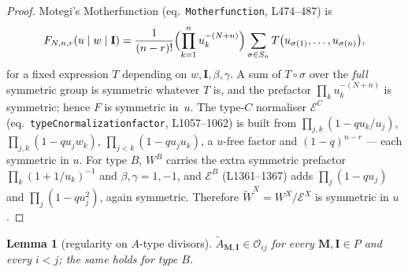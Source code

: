 \documentclass[11pt]{article}
\theoremstyle{plain}
\newtheorem{lem}[thm]{Lemma}
\theoremstyle{definition}
\theoremstyle{remark}
\theoremstyle{plain}
\newcommand{\bI}{\mathbf{I}}
\newcommand{\bM}{\mathbf{M}}
\newcommand{\At}{\widetilde{A}}
\begin{document}
\begin{proof}
Motegi's Motherfunction (eq.\ \texttt{Motherfunction}, L474--487) is
\[
   F_{N,n,r}(u\mid w\mid\bI)
   =\frac{1}{(n-r)!}\Bigl(\prod_{k=1}^{n}u_k^{-(N+n)}\Bigr)
     \sum_{\sigma\in S_n}T\bigl(u_{\sigma(1)},\dots,u_{\sigma(n)}\bigr),
\]
for a fixed expression $T$ depending on $w,\bI,\beta,\gamma$.  A sum of
$T\circ\sigma$ over the \emph{full} symmetric group is symmetric whatever $T$ is,
and the prefactor $\prod_k u_k^{-(N+n)}$ is symmetric; hence $F$ is symmetric
in~$u$.  The type-$C$ normaliser $\mathcal{E}^C$ (eq.\
\texttt{typeCnormalizationfactor}, L1057--1062) is built from
$\prod_{j,k}(1-qu_k/u_j)$, $\prod_{j,k}(1-qu_jw_k)$, $\prod_{j<k}(1-qu_ju_k)$,
a $u$-free factor and $(1-q)^{n-r}$ --- each symmetric in $u$.  For type $B$,
$W^B$ carries the extra symmetric prefactor $\prod_k(1+1/u_k)^{-1}$ and
$\beta,\gamma=1,-1$, and $\mathcal{E}^B$ (L1361--1367) adds
$\prod_j(1-qu_j)$ and $\prod_j(1-qu_j^2)$, again symmetric.  Therefore
$\widetilde{W}^X=W^X/\mathcal{E}^X$ is symmetric in $u$.
\end{proof}

\begin{lem}[regularity on $A$-type divisors]\label{lem:reg}
$\At_{\bM,\bI}\in\mathcal{O}_{ij}$ for every $\bM,\bI\in P$ and every $i<j$; the
same holds for type $B$.
\end{lem}
\end{document}

